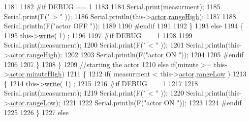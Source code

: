 \begin{DoxyCode}
1181 
1182 \textcolor{preprocessor}{            #if DEBUG == 1 }
1183 
1184                 Serial.print(measurment);
1185                 Serial.print(F(\textcolor{stringliteral}{" > "} ));
1186                 Serial.println(this->\hyperlink{class_cool_board_actor_a8f190db9f7a39fddbcef7f152da970e9}{actor}.\hyperlink{struct_cool_board_actor_1_1state_a6e5cd6c5cd44e2decfd8d4df1853f8e3}{rangeHigh});
1187 
1188                 Serial.println(F(\textcolor{stringliteral}{"actor OFF "}));
1189 
1190 \textcolor{preprocessor}{            #endif}
1191     
1192             \}
1193             \textcolor{keywordflow}{else} 
1194             \{
1195                 this->\hyperlink{class_cool_board_actor_a958786ff01ea1056ee72c72d439f86da}{write}( 1) ;
1196 
1197 \textcolor{preprocessor}{            #if DEBUG == 1 }
1198 
1199                 Serial.print(measurment);
1200                 Serial.print(F(\textcolor{stringliteral}{" < "} ));
1201                 Serial.println(this->\hyperlink{class_cool_board_actor_a8f190db9f7a39fddbcef7f152da970e9}{actor}.\hyperlink{struct_cool_board_actor_1_1state_a6e5cd6c5cd44e2decfd8d4df1853f8e3}{rangeHigh});
1202 
1203                 Serial.println(F(\textcolor{stringliteral}{"actor ON "}));
1204 
1205 \textcolor{preprocessor}{            #endif  }
1206                 
1207             \}
1208     \}   
1209     \textcolor{comment}{//starting the actor}
1210     \textcolor{keywordflow}{else} \textcolor{keywordflow}{if}(minute >= this->\hyperlink{class_cool_board_actor_a8f190db9f7a39fddbcef7f152da970e9}{actor}.\hyperlink{struct_cool_board_actor_1_1state_a4bff3d61ead74adb60be224764b93006}{minuteHigh})
1211     \{
1212             \textcolor{keywordflow}{if}( measurment < this->\hyperlink{class_cool_board_actor_a8f190db9f7a39fddbcef7f152da970e9}{actor}.\hyperlink{struct_cool_board_actor_1_1state_a43f891c9fb3bb63575c27cec860de55a}{rangeLow} )
1213             \{
1214                 this->\hyperlink{class_cool_board_actor_a958786ff01ea1056ee72c72d439f86da}{write}( 1) ;
1215 
1216 \textcolor{preprocessor}{            #if DEBUG == 1 }
1217 
1218                 Serial.print(measurment);
1219                 Serial.print(F(\textcolor{stringliteral}{" < "} ));
1220                 Serial.println(this->\hyperlink{class_cool_board_actor_a8f190db9f7a39fddbcef7f152da970e9}{actor}.\hyperlink{struct_cool_board_actor_1_1state_a43f891c9fb3bb63575c27cec860de55a}{rangeLow});
1221 
1222                 Serial.println(F(\textcolor{stringliteral}{"actor ON "}));
1223 
1224 \textcolor{preprocessor}{            #endif  }
1225 
1226             \}
1227             \textcolor{keywordflow}{else} 

\end{DoxyCode}
